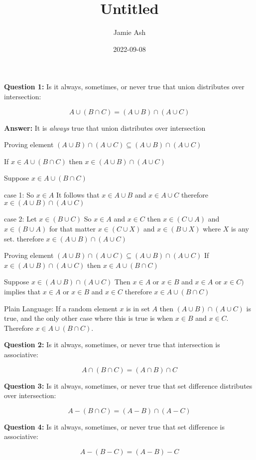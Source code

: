 \documentclass[
]{article}
\title{Untitled}
\author{Jamie Ash}
\date{2022-09-08}
\begin{document}
\maketitle

\textbf{Question 1:} Is it always, sometimes, or never true that union
distributes over intersection:

\[A ∪ (B ∩ C) = (A ∪ B) ∩ (A ∪ C)\]

\textbf{Answer:} It is \emph{always} true that union distributes over
intersection

Proving element
\((A ∪ B) ∩ (A ∪ C) \subseteq (A \cup B) \cap (A \cup C)\)

If \(x \in A \cup (B \cap C)\) then \(x \in (A \cup B) \cap (A \cup C)\)

Suppose \(x \in A \cup (B \cap C)\)

case 1: So \(x \in A\) It follows that \(x \in A \cup B\) and
\(x \in A \cup C\) therefore \(x \in (A \cup B) \cap (A \cup C)\)

case 2: Let \(x \in (B \cup C)\) So \(x \in A\) and \(x \in C\) then
\(x \in (C \cup A)\) and \(x \in (B \cup A)\) for that matter
\(x \in (C \cup X)\) and \(x \in (B \cup X)\) where \(X\) is any set.
therefore \(x \in (A \cup B) \cap (A \cup C)\)

Proving element
\((A \cup B) \cap (A \cup C) \subseteq (A ∪ B) ∩ (A ∪ C)\) If
\(x \in (A \cup B) \cap (A \cup C)\) then \(x \in A \cup (B \cap C)\)

Suppose \(x \in (A \cup B) \cap (A \cup C)\) Then \(x \in A\) or
\(x \in B\) and \(x \in A\) or \(x \in C)\) implies that \(x \in A\) or
\(x \in B\) and \(x \in C\) therefore \(x \in A \cup (B \cap C)\)

Plain Language: If a random element \(x\) is in set \(A\) then
\((A \cup B) \cap (A \cup C)\) is true, and the only other case where
this is true is when \(x \in B\) and \(x \in C\). Therefore
\(x \in A \cup (B \cap C)\).

\textbf{Question 2:} Is it always, sometimes, or never true that
intersection is associative:

\[
A \cap (B \cap C) = (A \cap B) \cap C
\]

\textbf{Question 3:} Is it always, sometimes, or never true that set
difference distributes over intersection:

\[
A - (B \cap C) = (A - B) \cap (A - C)
\]

\textbf{Question 4:} Is it always, sometimes, or never true that set
difference is associative:

\[ 
A - (B - C) = (A - B) - C
\]
\end{document}
